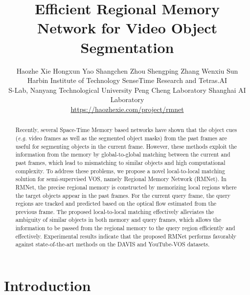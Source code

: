 \documentclass[final]{cvpr}
\begin{document}
\title{Efficient Regional Memory Network for Video Object Segmentation}

\author{
Haozhe Xie\hspace{4 mm}
Hongxun Yao \hspace{4 mm}
Shangchen Zhou \hspace{4 mm}
Shengping Zhang \hspace{4 mm}
Wenxiu Sun\\
 Harbin Institute of Technology\hspace{4 mm}
 SenseTime Research and Tetras.AI\\
 S-Lab, Nanyang Technological University\hspace{4 mm}
 Peng Cheng Laboratory\hspace{4 mm}
 Shanghai AI Laboratory\\
\url{https://haozhexie.com/project/rmnet}
}

\maketitle


\begin{abstract}
Recently, several Space-Time Memory based networks have shown that the object cues ({\it e.g.} video frames as well as the segmented object masks) from the past frames are useful for segmenting objects in the current frame.
However, these methods exploit the information from the memory by global-to-global matching between the current and past frames, which lead to mismatching to similar objects and high computational complexity.
To address these problems, we propose a novel local-to-local matching solution for semi-supervised VOS, namely Regional Memory Network (RMNet).
In RMNet, the precise regional memory is constructed by memorizing local regions where the target objects appear in the past frames.
For the current query frame, the query regions are tracked and predicted based on the optical flow estimated from the previous frame.
The proposed local-to-local matching effectively alleviates the ambiguity of similar objects in both memory and query frames, which allows the information to be passed from the regional memory to the query region efficiently and effectively.
Experimental results indicate that the proposed RMNet performs favorably against state-of-the-art methods on the DAVIS and YouTube-VOS datasets.
\end{abstract}

\section{Introduction}
\end{document}
